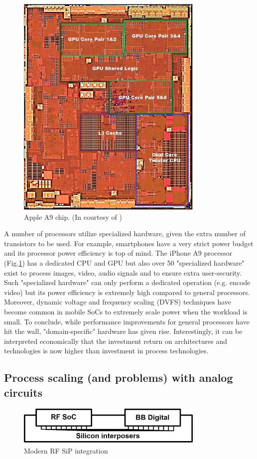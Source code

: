 \begin{figure}[!]
\centering
  \includegraphics[width=0.8\textwidth]{figure/chap1/A9PNG.jpg}
  \caption{Apple A9 chip. (In courtesy of \cite{a9})}
  \label{A9}
\end{figure}

A number of processors utilize specialized hardware, given the extra number of transistors to be used.
For example, smartphones have a very strict power budget and its processor power efficiency is top of mind.
The iPhone A9 processor (Fig.\ref{A9}) has a dedicated CPU and GPU but also over 50 "specialized hardware" exist to process images, video, audio signals and to ensure extra user-security.
Such "specialized hardware" can only perform a dedicated operation (e.g. encode video) but its power efficiency is extremely high compared to general processors.
Moreover, dynamic voltage and frequency scaling (DVFS) techniques have become common in mobile SoCs to extremely scale power when the workload is small.
To conclude, while performance improvements for general processors have hit the wall, "domain-specific" hardware has given rise. 
Interestingly, it can be interpreted economically that the investment return on architectures and technologies is now higher than investment in process technologies.

\subsection{Process scaling (and problems) with analog circuits}
\begin{figure}[!]
\centering
  \includegraphics[width=0.8\textwidth]{figure/chap1/interposer.jpg}
  \caption{Modern RF SiP integration}
  \label{RFSIP}
\end{figure}

